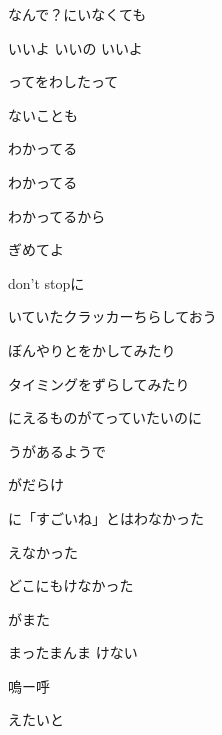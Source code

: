 \documentclass[a4paper,tate,twocolumn,12pt]{ltjtarticle}
\begin{document}
\begin{flushleft}
\vspace{2em}

\noindent\begin{minipage}{\linewidth}
なんで？にいなくても

いいよ いいの いいよ

ってをわしたって

ないことも

わかってる

わかってる

わかってるから

ぎめてよ

don't stopに

いていたクラッカーちらしておう
\end{minipage}

\vspace{2em}

\noindent\begin{minipage}{\linewidth}
ぼんやりとをかしてみたり

タイミングをずらしてみたり

にえるものがてっていたいのに
\end{minipage}

\vspace{2em}

\noindent\begin{minipage}{\linewidth}
うがあるようで

がだらけ

に「すごいね」とはわなかった

えなかった

どこにもけなかった

がまた

まったまんま けない

嗚ー呼
\end{minipage}

\vspace{2em}

\noindent\begin{minipage}{\linewidth}
えたいと


\end{minipage}
\end{flushleft}
\end{document}
